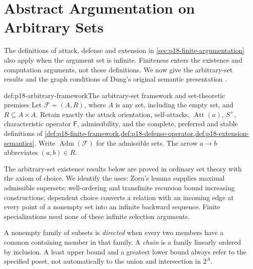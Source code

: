 \chapter{Abstract Argumentation on Arbitrary Sets}
\label{sec:p18-arbitrary-argumentation}

The definitions of attack, defense and extension in
\cref{sec:p18-finite-argumentation} also apply when the argument set
is infinite. Finiteness enters the existence and computation
arguments, not those definitions. We now give the arbitrary-set
results and the graph conditions of Dung's original semantic
presentation \cite[sec.~2, pp.~325--334]{Dung1995}.

\begin{hbdefinition}{def:p18-arbitrary-framework}{The arbitrary-set framework and set-theoretic premises}
Let \(\mathcal F=(A,R)\), where \(A\) is any set, including the
empty set, and \(R\subseteq A\times A\). Retain exactly the
attack orientation, self-attacks, \(\operatorname{Att}(a)\),
\(S^+\), characteristic operator \(\mathsf F\), admissibility,
and the complete, preferred and stable definitions of
\cref{def:p18-finite-framework,def:p18-defense-operator,def:p18-extension-semantics}.
Write \(\operatorname{Adm}(\mathcal F)\) for the admissible sets.
The arrow \(a\to b\) abbreviates \((a,b)\in R\).

The arbitrary-set existence results below are proved in ordinary
set theory with the axiom of choice. We identify the uses:
Zorn's lemma supplies maximal admissible supersets; well-ordering
and transfinite recursion bound increasing constructions;
dependent choice converts a relation with an incoming edge
at every point of a nonempty set into an infinite backward
sequence. Finite specializations need none of these
infinite selection arguments.

A nonempty family of subsets is \emph{directed} when every
two members have a common containing member in that family.
A \emph{chain} is a family linearly ordered by inclusion.
A least upper bound and a greatest lower bound always
refer to the specified poset, not automatically to the
union and intersection in \(2^A\).
\end{hbdefinition}


